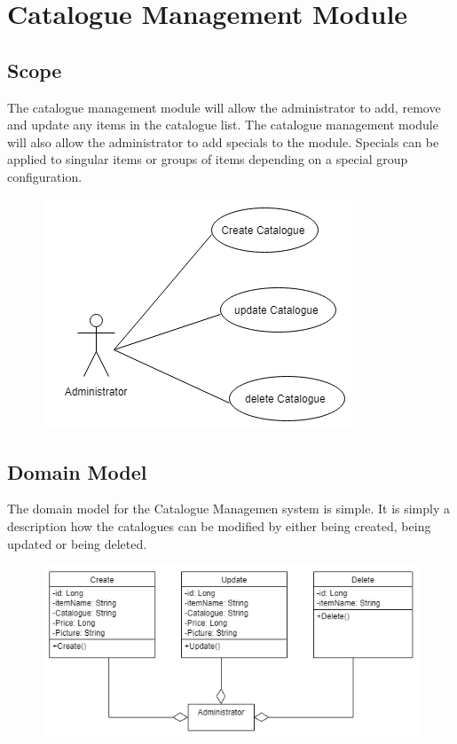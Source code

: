 \documentclass[12pt]{article}
\begin{document}
\section{Catalogue Management Module}
\subsection{Scope}
The catalogue management module will allow the administrator to add, remove and update any items in the catalogue list.
The catalogue management module will also allow the  administrator to add specials to the module. Specials can be applied to singular items or groups of items depending on a special group configuration.
\begin{figure}[h]
\centering
\includegraphics[scale=0.575]{diagrams/notS.png}
\end{figure}
\newpage
\subsection{Domain Model}
The domain model for the Catalogue Managemen system is simple. It is simply a description how the  catalogues can be modified by either being created, being updated or being deleted.
\begin{figure}[h]
\centering
\includegraphics[scale=0.7]{diagrams/notdom.png}
\end{figure}
\newpage
\end{document}
